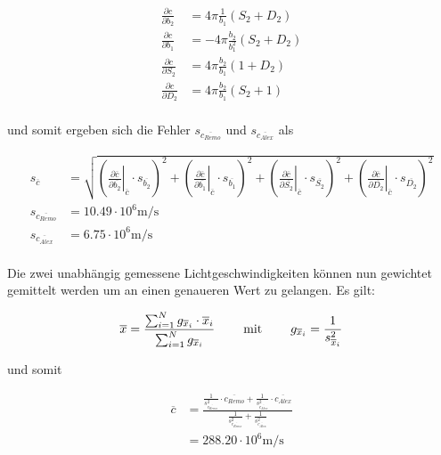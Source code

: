 \begin{align*}
    \frac{\partial c}{\partial b_2}   &= 4\pi\frac{1}{b_1}(S_2+D_2) \\
    \frac{\partial c}{\partial b_1}   &= -4\pi\frac{b_2}{b_1^2}(S_2+D_2) \\
    \frac{\partial c}{\partial S_2}   &= 4\pi\frac{b_2}{b_1}(1+D_2) \\
    \frac{\partial c}{\partial D_2}   &= 4\pi\frac{b_2}{b_1}(S_2+1) \\
\end{align*}

und    somit   ergeben   sich   die   Fehler   $s_{\overline{c_{Remo}}}$   und
$s_{\overline{c_{Alex}}}$ als

\begin{align*}
    s_{\overline{c}}            &= \sqrt{ \left( \left.\frac{\partial \overline{c}}{\partial \overline{b_2}} \right\rvert_{\overline{c}} \cdot s_{\overline{b_2}} \right)^2
                                        + \left( \left.\frac{\partial \overline{c}}{\partial \overline{b_1}} \right\rvert_{\overline{c}} \cdot s_{\overline{b_1}} \right)^2
                                        + \left( \left.\frac{\partial \overline{c}}{\partial \overline{S_2}} \right\rvert_{\overline{c}} \cdot s_{\overline{S_2}} \right)^2
                                        + \left( \left.\frac{\partial \overline{c}}{\partial \overline{D_2}} \right\rvert_{\overline{c}} \cdot s_{\overline{D_2}} \right)^2 } \\
    s_{\overline{c_{Remo}}}     &= 10.49 \cdot 10^6 \textrm{m}/\textrm{s} \\
    s_{\overline{c_{Alex}}}     &= 6.75 \cdot 10^6 \textrm{m}/\textrm{s} \\
\end{align*}

Die zwei unabh\"angig gemessene Lichtgeschwindigkeiten  k\"onnen  nun  gewichtet
gemittelt  werden   um   an   einen   genaueren   Wert  zu  gelangen.  Es  gilt:

\begin{align*}
    \overline{x} &= \frac{\sum_{i=1}^{N} g_{\overline{x}_i} \cdot \overline{x}_i}{\sum_{i=1}^{N} g_{\overline{x}_i}} \hspace{8mm}\textrm{mit}\hspace{8mm} g_{\overline{x}_i} = \frac{1}{s^2_{\overline{x}_i}} \\
\end{align*}

und somit

\begin{align*}
    \overline{c}  &= \frac{ \frac{1}{s_{\overline{c_{Remo}}}^2} \cdot \overline{c_{Remo}} + \frac{1}{s_{\overline{c_{Alex}}}^2} \cdot \overline{c_{Alex}} }
                          { \frac{1}{s_{\overline{c_{Remo}}}^2} + \frac{1}{s_{\overline{c_{Alex}}}^2} } \\
                  &= 288.20 \cdot 10^6 \textrm{m}/\textrm{s} \\ 
\end{align*}

